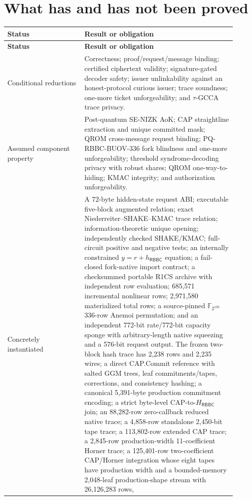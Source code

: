 \documentclass[11pt]{article}
\newcommand{\RBBC}{\mathsf{RBBC}}
\begin{document}
\section{What has and has not been proved}

\begin{longtable}{p{0.31\linewidth}p{0.61\linewidth}}
\toprule
\textbf{Status} & \textbf{Result or obligation}\\
\midrule
\endfirsthead
\toprule
\textbf{Status} & \textbf{Result or obligation}\\
\midrule
\endhead
\bottomrule
\endfoot
Conditional reductions & Correctness; proof/request/message binding;
certified ciphertext validity; signature-gated decoder safety; issuer
unlinkability against an honest-protocol curious issuer; trace soundness;
one-more ticket unforgeability; and $\tau$-GCCA trace privacy.\\
\addlinespace
Assumed component property & Post-quantum SE-NIZK AoK; CAP straightline
extraction and unique committed mask; QROM cross-message request binding;
PQ-RBBC-BUOV-336 fork blindness and one-more
unforgeability; threshold syndrome-decoding privacy with robust shares; QROM
one-way-to-hiding; KMAC integrity; and
authorization unforgeability.\\
\addlinespace
Concretely instantiated & A 72-byte hidden-state request ABI; executable
five-block augmented relation; exact Niederreiter--SHAKE--KMAC trace relation;
information-theoretic unique opening; independently checked SHAKE/KMAC;
full-circuit positive and negative tests; an internally constrained
$y=r+h_{\RBBC}$ equation; a fail-closed fork-native import contract; a checksummed
portable R1CS archive with independent row evaluation; 685,571 incremental
nonlinear rows; 2,971,580 materialized total rows; a source-pinned
$\mathbb F_{2^{193}}$ 336-row Anemoi permutation; and an independent 772-bit
rate/772-bit capacity sponge with arbitrary-length native squeezing and a
576-bit request output.  The frozen two-block
hash trace has 2,238 rows and 2,235 wires; a direct CAP.Commit reference with
salted GGM trees, leaf commitments/tapes, corrections, and consistency hashing;
a canonical 5,391-byte production commitment encoding; a strict byte-level
CAP-to-$H_{\RBBC}$ join; an 88,282-row zero-callback reduced native trace; a
4,858-row standalone 2,450-bit tape trace; a 113,802-row extended CAP trace;
a 2,845-row production-width 11-coefficient Horner trace; a 125,401-row
two-coefficient CAP/Horner integration whose eight tapes have production width
and a bounded-memory 2,048-leaf production-shape stream with 26,126,283 rows,

\end{longtable}
\end{document}
